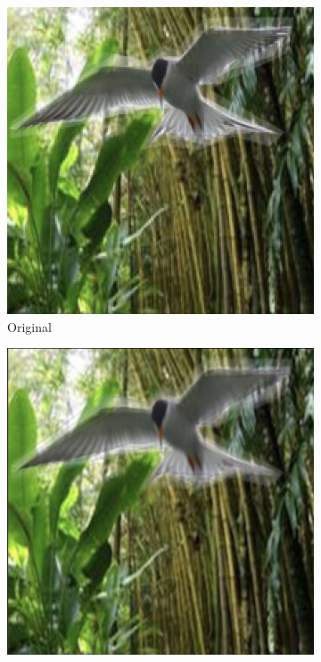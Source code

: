 \begin{figure}[!t]
\centering
\begin{subfigure}[b]{0.19\textwidth}
  \includegraphics[width=0.99\linewidth]{plotsAistats/waterbird_original_example.png}
  \caption{Original}
  \label{fig:motion_blur_or}
\end{subfigure}
\begin{subfigure}[b]{0.19\textwidth}
  \includegraphics[width=0.99\linewidth]{plotsAistats/motion_blur_5.png}

\end{subfigure}
\end{figure}
